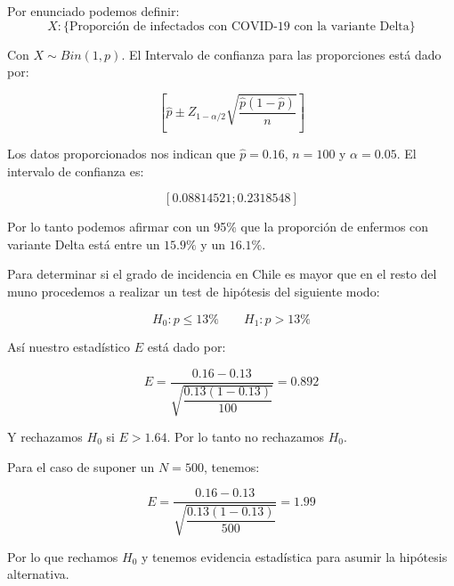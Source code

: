 \begin{solution}
Por enunciado podemos definir:
$$X :\{ \text{Proporción de infectados con COVID-19 con la variante Delta} \}$$

Con  $X \sim Bin(1,p)$. El Intervalo de confianza para las proporciones está dado por:

$$\left[ \widehat{p} \pm Z_{1-\alpha/2} \sqrt{\dfrac{\widehat{p}(1-\widehat{p})}{n}}\right]$$

Los datos proporcionados nos indican que $\widehat{p}= 0.16$, $n=100$ y $\alpha=0.05$. El intervalo de confianza es:

$$[0.08814521; 0.2318548]$$

Por lo tanto podemos afirmar con un 95\% que la proporción de enfermos con variante Delta está entre un $15.9\%$ y un $16.1\%$.

Para determinar si el grado de incidencia en Chile es mayor que en el resto del muno procedemos a realizar un test de hipótesis del siguiente modo:

$$H_0:p \leq 13\% \quad \quad   H_1: p>13\%$$

Así nuestro estadístico $E$ está dado por:

$$E = \dfrac{0.16-0.13}{\sqrt{\dfrac{0.13(1-0.13)}{100}}} = 0.892 $$
 
Y rechazamos $H_0$ si $E>1.64$. Por lo tanto no rechazamos $H_0$.

Para el caso de suponer un $N=500$, tenemos:

$$E = \dfrac{0.16-0.13}{\sqrt{\dfrac{0.13(1-0.13)}{500}}} = 1.99 $$

Por lo que rechamos $H_0$ y tenemos evidencia estadística para asumir la hipótesis alternativa.
\end{solution}